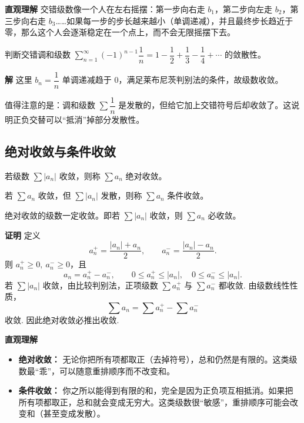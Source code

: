 \documentclass[fontset=fandol]{ctexart}
\newenvironment{custom}[1]{\par\noindent\textbf{#1}\quad}{\par\vspace{0.8em}}
\begin{document}
\begin{custom}{直观理解}
交错级数像一个人在左右摇摆：第一步向右走 \(b_1\)，第二步向左走 \(b_2\)，第三步向右走 \(b_3\)……如果每一步的步长越来越小（单调递减），并且最终步长趋近于零，那么这个人会逐渐稳定在一个点上，而不会无限摇摆下去。
\end{custom}

\begin{example}
判断交错调和级数 \(\sum_{n=1}^{\infty} (-1)^{n-1} \dfrac{1}{n} = 1 - \dfrac12 + \dfrac13 - \dfrac14 + \cdots\) 的敛散性。
\end{example}
\begin{custom}{解}
这里 \(b_n = \dfrac{1}{n}\) 单调递减趋于 0，满足莱布尼茨判别法的条件，故级数收敛。

值得注意的是：调和级数 \(\sum \dfrac{1}{n}\) 是发散的，但给它加上交错符号后却收敛了。这说明正负交替可以“抵消”掉部分发散性。
\end{custom}

\subsection{绝对收敛与条件收敛}

\begin{definition}[绝对收敛]
若级数 \(\sum |a_n|\) 收敛，则称 \(\sum a_n\) 绝对收敛。
\end{definition}

\begin{definition}[条件收敛]
若 \(\sum a_n\) 收敛，但 \(\sum |a_n|\) 发散，则称 \(\sum a_n\) 条件收敛。
\end{definition}

\begin{theorem}[绝对收敛与收敛的关系]
绝对收敛的级数一定收敛。即若 \(\sum |a_n|\) 收敛，则 \(\sum a_n\) 必收敛。
\end{theorem}

\begin{custom}{证明}
定义
\[
a_n^+=\frac{|a_n|+a_n}{2},\qquad a_n^-=\frac{|a_n|-a_n}{2}.
\]
则 $a_n^+\ge0,\ a_n^-\ge0$，且
\[
a_n=a_n^+-a_n^-,\qquad 0\le a_n^+\le |a_n|,\quad 0\le a_n^-\le |a_n|.
\]
若 $\sum |a_n|$ 收敛，由比较判别法，正项级数 $\sum a_n^+$ 与 $\sum a_n^-$ 都收敛. 由级数线性性质，
\[
\sum a_n=\sum a_n^+-\sum a_n^-
\]
收敛. 因此绝对收敛必推出收敛.
\end{custom}

\begin{custom}{直观理解}
\begin{itemize}
\item \textbf{绝对收敛：} 无论你把所有项都取正（去掉符号），总和仍然是有限的。这类级数最“乖”，可以随意重排顺序而不改变和。
\item \textbf{条件收敛：} 你之所以能得到有限的和，完全是因为正负项互相抵消。如果把所有项都取正，总和就会变成无穷大。这类级数很“敏感”，重排顺序可能会改变和（甚至变成发散）。
\end{itemize}
\end{custom}
\end{document}
